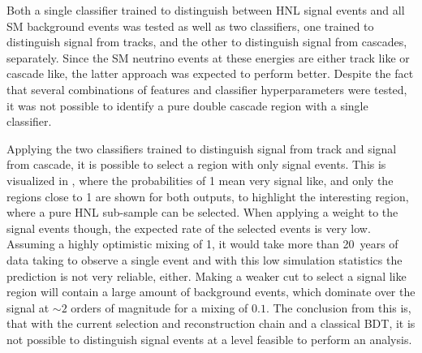 Both a single classifier trained to distinguish between HNL signal events and all SM background events was tested as well as two classifiers, one trained to distinguish signal from tracks, and the other to distinguish signal from cascades, separately. Since the SM neutrino events at these energies are either track like or cascade like, the latter approach was expected to perform better. Despite the fact that several combinations of features and classifier hyperparameters were tested, it was not possible to identify a pure double cascade region with a single classifier.



Applying the two classifiers trained to distinguish signal from track and signal from cascade, it is possible to select a region with only signal events. This is visualized in , where the probabilities of 1 mean very signal like, and only the regions close to 1 are shown for both outputs, to highlight the interesting region, where a pure HNL sub-sample can be selected. When applying a weight to the signal events though, the expected rate of the selected events is very low. Assuming a highly optimistic mixing of 1, it would take more than \SI{20}{years} of data taking to observe a single event and with this low simulation statistics the prediction is not very reliable, either. Making a weaker cut to select a signal like region will contain a large amount of background events, which dominate over the signal at $\sim2$ orders of magnitude for a mixing of $0.1$. The conclusion from this is, that with the current selection and reconstruction chain and a classical BDT, it is not possible to distinguish signal events at a level feasible to perform an analysis.

